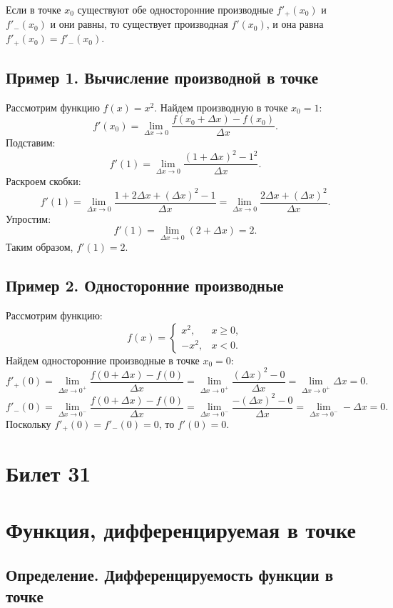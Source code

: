 \documentclass{article}
\begin{document}
Если в точке \( x_0 \) существуют обе односторонние производные \( f'_+(x_0) \) и \( f'_-(x_0) \) и они равны, то существует производная \( f'(x_0) \), и она равна \( f'_+(x_0) = f'_-(x_0) \).

\subsection{Пример 1. Вычисление производной в точке}

Рассмотрим функцию \( f(x) = x^2 \). Найдем производную в точке \( x_0 = 1 \):
\[
f'(x_0) = \lim\limits_{\Delta x \to 0} \frac{f(x_0 + \Delta x) - f(x_0)}{\Delta x}.
\]
Подставим:
\[
f'(1) = \lim\limits_{\Delta x \to 0} \frac{(1 + \Delta x)^2 - 1^2}{\Delta x}.
\]
Раскроем скобки:
\[
f'(1) = \lim\limits_{\Delta x \to 0} \frac{1 + 2\Delta x + (\Delta x)^2 - 1}{\Delta x} = \lim\limits_{\Delta x \to 0} \frac{2\Delta x + (\Delta x)^2}{\Delta x}.
\]
Упростим:
\[
f'(1) = \lim\limits_{\Delta x \to 0} (2 + \Delta x) = 2.
\]
Таким образом, \( f'(1) = 2 \).

\subsection{Пример 2. Односторонние производные}

Рассмотрим функцию:
\[
f(x) =
\begin{cases}
x^2, & x \geq 0, \\
-x^2, & x < 0.
\end{cases}
\]
Найдем односторонние производные в точке \( x_0 = 0 \):
\[
f'_+(0) = \lim\limits_{\Delta x \to 0^+} \frac{f(0 + \Delta x) - f(0)}{\Delta x} = \lim\limits_{\Delta x \to 0^+} \frac{(\Delta x)^2 - 0}{\Delta x} = \lim\limits_{\Delta x \to 0^+} \Delta x = 0.
\]
\[
f'_-(0) = \lim\limits_{\Delta x \to 0^-} \frac{f(0 + \Delta x) - f(0)}{\Delta x} = \lim\limits_{\Delta x \to 0^-} \frac{- (\Delta x)^2 - 0}{\Delta x} = \lim\limits_{\Delta x \to 0^-} -\Delta x = 0.
\]
Поскольку \( f'_+(0) = f'_-(0) = 0 \), то \( f'(0) = 0 \).

\section{Билет 31}

\section*{Функция, дифференцируемая в точке}

\subsection{Определение. Дифференцируемость функции в точке}
\end{document}
